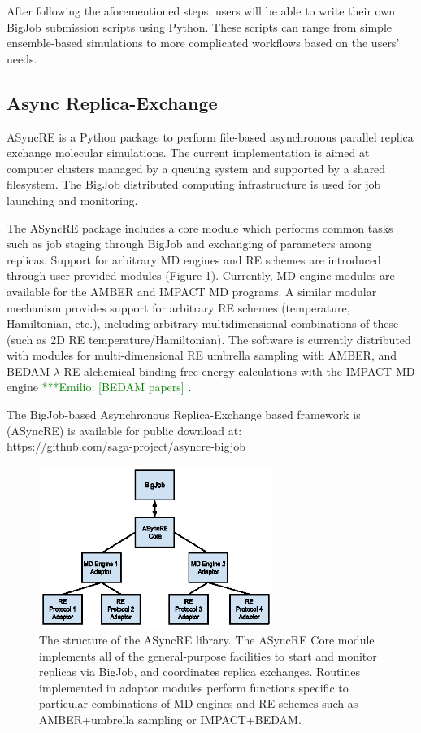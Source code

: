 \documentclass{sig-alternate}
\newcommand{\egnote}[1]{ {\textcolor{green} { ***Emilio: #1 }}}
\begin{document}
After following the aforementioned steps, users will be able to write
their own BigJob submission scripts using Python. These scripts can
range from simple ensemble-based simulations to more complicated
workflows based on the users' needs.

\subsection{Async Replica-Exchange}

ASyncRE is a Python package to perform file-based asynchronous
parallel replica exchange molecular simulations. The current
implementation is aimed at computer clusters managed by a queuing
system and supported by a shared filesystem. The BigJob distributed
computing infrastructure is used for job launching and monitoring.

The ASyncRE package includes a core module which performs common tasks
such as job staging through BigJob and exchanging of parameters among
replicas. Support for arbitrary MD engines and RE schemes are
introduced through user-provided modules (Figure \ref{fig:aRE_chart}). Currently, MD
engine modules are available for the AMBER and IMPACT MD programs. A
similar modular mechanism provides support for arbitrary RE schemes
(temperature, Hamiltonian, etc.), including arbitrary multidimensional
combinations of these (such as 2D RE temperature/Hamiltonian). The
software is currently distributed with modules for multi-dimensional RE
umbrella sampling with AMBER\cite{AMBER12}, and BEDAM $\lambda$-RE alchemical binding
free energy calculations with the IMPACT MD engine \egnote{[BEDAM papers]}.

The BigJob-based Asynchronous Replica-Exchange based framework is (ASyncRE) is available for public download at: \\
\url{https://github.com/saga-project/asyncre-bigjob}

\begin{figure}
\includegraphics[width=3in]{asyncre.eps}
\caption{\label{fig:aRE_chart}The structure of the ASyncRE
  library. The ASyncRE Core module implements all of the
  general-purpose facilities to start and monitor replicas via BigJob,
  and coordinates replica exchanges. Routines implemented in adaptor
  modules perform functions specific to particular combinations of MD
  engines and RE schemes such as AMBER+umbrella sampling or IMPACT+BEDAM.  }
\end{figure}
\end{document}
